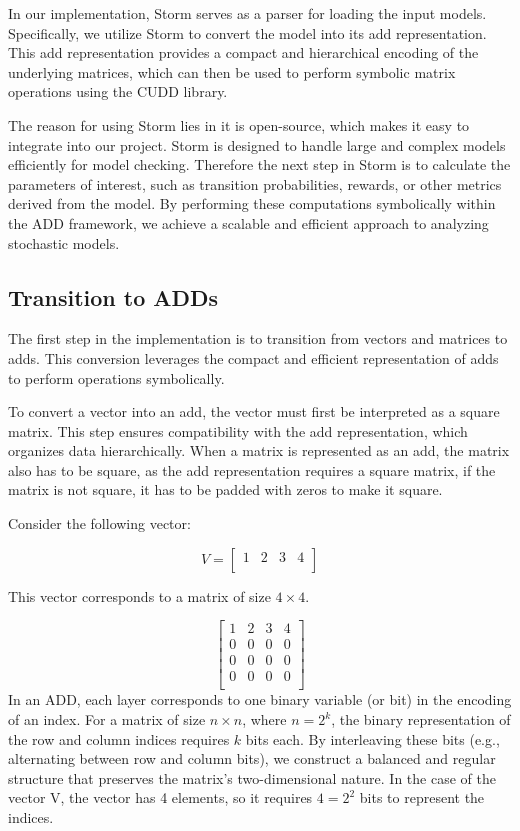 In our implementation, Storm serves as a parser for loading the input models. Specifically, we utilize Storm to convert the model into its \gls{add} representation. This \gls{add} representation provides a compact and hierarchical encoding of the underlying matrices, which can then be used to perform symbolic matrix operations using the CUDD library.

The reason for using Storm lies in it is open-source, which makes it easy to integrate into our project. Storm is designed to handle large and complex models efficiently for model checking.
Therefore the next step in Storm is to calculate the parameters of interest, such as transition probabilities, rewards, or other metrics derived from the model. By performing these computations symbolically within the ADD framework, we achieve a scalable and efficient approach to analyzing stochastic models.

\subsection{Transition to ADDs}\label{subsec:transition-to-adds}
The first step in the implementation is to transition from vectors and matrices to \glspl{add}.
This conversion leverages the compact and efficient representation of \glspl{add} to perform operations symbolically.

To convert a vector into an \gls{add}, the vector must first be interpreted as a square matrix.
This step ensures compatibility with the \gls{add} representation, which organizes data hierarchically.
When a matrix is represented as an \gls{add}, the matrix also has to be square, as the \gls{add} representation requires a square matrix, if the matrix is not square, it has to be padded with zeros to make it square.

Consider the following vector:

\[
    V=
    \begin{bmatrix}
        1 & 2 & 3 & 4 \\
    \end{bmatrix}
\]

This vector corresponds to a matrix of size $4 \times 4$.

\[
    \begin{bmatrix}
        1 & 2 & 3 & 4 \\
        0 & 0 & 0 & 0 \\
        0 & 0 & 0 & 0 \\
        0 & 0 & 0 & 0 \\
    \end{bmatrix}
\]
In an ADD, each layer corresponds to one binary variable (or bit) in the encoding of an index. 
For a matrix of size $n \times n$, where $n = 2^k$, the binary representation of the row and column indices requires $k$ bits each. 
By interleaving these bits (e.g., alternating between row and column bits), we construct a balanced and regular structure that preserves the matrix's two-dimensional nature.
In the case of the vector V, the vector has 4 elements, so it requires $4 = 2^2$ bits to represent the indices.

